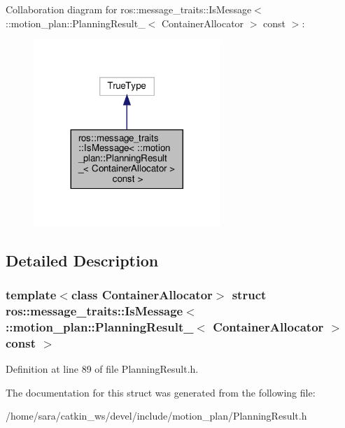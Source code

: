 Collaboration diagram for ros\+:\+:message\+\_\+traits\+:\+:Is\+Message$<$ \+:\+:motion\+\_\+plan\+:\+:Planning\+Result\+\_\+$<$ Container\+Allocator $>$ const $>$\+:
\nopagebreak
\begin{figure}[H]
\begin{center}
\leavevmode
\includegraphics[width=200pt]{structros_1_1message__traits_1_1IsMessage_3_01_1_1motion__plan_1_1PlanningResult___3_01Container8d29efab6ff7dc01778bb2a83b569e30}
\end{center}
\end{figure}


\subsection{Detailed Description}
\subsubsection*{template$<$class Container\+Allocator$>$\newline
struct ros\+::message\+\_\+traits\+::\+Is\+Message$<$ \+::motion\+\_\+plan\+::\+Planning\+Result\+\_\+$<$ Container\+Allocator $>$ const $>$}



Definition at line 89 of file Planning\+Result.\+h.



The documentation for this struct was generated from the following file\+:\begin{DoxyCompactItemize}
\item 
/home/sara/catkin\+\_\+ws/devel/include/motion\+\_\+plan/Planning\+Result.\+h\end{DoxyCompactItemize}
